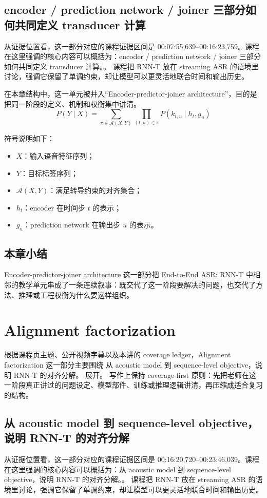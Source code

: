 \documentclass[a4paper]{article}
\begin{document}
\subsection{encoder / prediction network / joiner 三部分如何共同定义 transducer 计算}
从证据位置看，这一部分对应的课程证据区间是 00:07:55,639--00:16:23,759。课程在这里强调的核心内容可以概括为：encoder / prediction network / joiner 三部分如何共同定义 transducer 计算。。
课程把 RNN-T 放在 streaming ASR 的语境里讨论，强调它保留了单调约束，却让模型可以更灵活地联合时间和输出历史。

在本章结构中，这一单元被并入“Encoder-predictor-joiner architecture”，目的是把同一阶段的定义、机制和权衡集中讲清。
\[
P(Y \mid X) = \sum_{\pi \in \mathcal{A}(X,Y)} \prod_{(t,u)\in\pi} P(k_{t,u} \mid h_t, g_u)
\]

符号说明如下：
\begin{itemize}
\item $X$：输入语音特征序列；
\item $Y$：目标标签序列；
\item $\mathcal{A}(X,Y)$：满足转导约束的对齐集合；
\item $h_t$：encoder 在时间步 $t$ 的表示；
\item $g_u$：prediction network 在输出步 $u$ 的表示。
\end{itemize}

\subsection{本章小结}
Encoder-predictor-joiner architecture 这一部分把 End-to-End ASR: RNN-T 中相邻的教学单元串成了一条连续叙事：既交代了这一阶段要解决的问题，也交代了方法、推理或工程权衡为什么要这样组织。

\section{Alignment factorization}
根据课程页主题、公开视频字幕以及本讲的 coverage ledger，Alignment factorization 这一部分主要围绕 从 acoustic model 到 sequence-level objective，说明 RNN-T 的对齐分解。 展开。
写作上保持 coverage-first 原则：先把老师在这一阶段真正讲过的问题设定、模型部件、训练或推理逻辑讲清，再压缩成适合复习的结构。

\subsection{从 acoustic model 到 sequence-level objective，说明 RNN-T 的对齐分解}
从证据位置看，这一部分对应的课程证据区间是 00:16:20,720--00:23:46,039。课程在这里强调的核心内容可以概括为：从 acoustic model 到 sequence-level objective，说明 RNN-T 的对齐分解。。
课程把 RNN-T 放在 streaming ASR 的语境里讨论，强调它保留了单调约束，却让模型可以更灵活地联合时间和输出历史。
\end{document}
